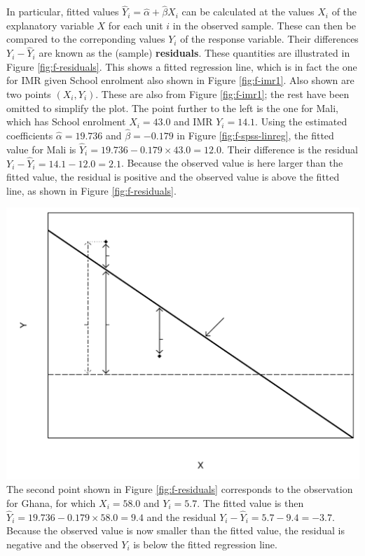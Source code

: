 \documentclass[11pt,a4paper,openany]{book}
\begin{document}
In particular, fitted values
\(\hat{Y}_{i}=\hat{\alpha}+\hat{\beta}X_{i}\) can be calculated at the
values \(X_{i}\) of the explanatory variable \(X\) for each unit \(i\)
in the observed sample. These can then be compared to the correponding
values \(Y_{i}\) of the response variable. Their differences
\(Y_{i}-\hat{Y}_{i}\) are known as the (sample) \textbf{residuals}.
These quantities are illustrated in Figure \ref{fig:f-residuals}. This
shows a fitted regression line, which is in fact the one for IMR given
School enrolment also shown in Figure \ref{fig:f-imr1}. Also shown are
two points \((X_{i}, Y_{i})\). These are also from Figure
\ref{fig:f-imr1}; the rest have been omitted to simplify the plot. The
point further to the left is the one for Mali, which has School
enrolment \(X_{i}=43.0\) and IMR \(Y_{i}=14.1\). Using the estimated
coefficients \(\hat{\alpha}=19.736\) and \(\hat{\beta}=-0.179\) in
Figure \ref{fig:f-spss-linreg}, the fitted value for Mali is
\(\hat{Y}_{i}=19.736-0.179\times 43.0=12.0\). Their difference is the
residual \(Y_{i}-\hat{Y}_{i}=14.1-12.0=2.1\). Because the observed value
is here larger than the fitted value, the residual is positive and the
observed value is above the fitted line, as shown in Figure
\ref{fig:f-residuals}.

\includegraphics[width=13.50000cm]{lmresids.pdf} The second point shown
in Figure \ref{fig:f-residuals} corresponds to the observation for
Ghana, for which \(X_{i}=58.0\) and \(Y_{i}=5.7\). The fitted value is
then \(\hat{Y}_{i}=19.736-0.179\times 58.0=9.4\) and the residual
\(Y_{i}-\hat{Y}_{i}=5.7-9.4=-3.7\). Because the observed value is now
smaller than the fitted value, the residual is negative and the observed
\(Y_{i}\) is below the fitted regression line.
\end{document}
